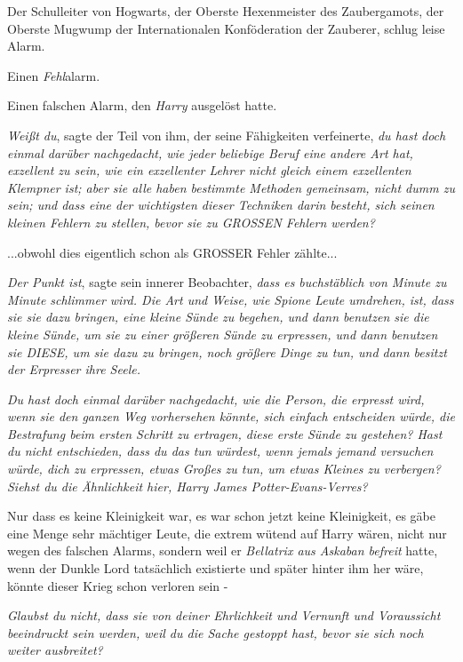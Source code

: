 {Der Schulleiter von Hogwarts, der Oberste Hexenmeister des Zaubergamots, der Oberste Mugwump der Internationalen Konföderation der Zauberer, schlug leise Alarm.

Einen \emph{Fehl}alarm.

Einen falschen Alarm, den \emph{Harry} ausgelöst hatte.

\emph{Weißt du}, sagte der Teil von ihm, der seine Fähigkeiten verfeinerte, \emph{du hast} \emph{doch} \emph{einmal darüber nachgedacht, wie jeder beliebige Beruf eine andere Art hat, exzellent zu sein, wie ein exzellenter Lehrer nicht gleich einem exzellenten Klempner ist; aber sie alle haben bestimmte Methoden gemeinsam, nicht dumm zu sein; und dass eine der wichtigsten dieser Techniken darin besteht, sich seinen kleinen Fehlern zu stellen, bevor sie zu GROSSEN Fehlern werden?}

...obwohl dies eigentlich schon als GROSSER Fehler zählte...

\emph{Der Punkt ist}, sagte sein innerer Beobachter, \emph{dass es buchstäblich von Minute zu Minute schlimmer wird. Die Art und Weise, wie Spione Leute umdrehen, ist, dass sie sie dazu bringen, eine kleine Sünde zu begehen, und dann benutzen sie die kleine Sünde, um sie zu einer größeren Sünde zu erpressen, und dann benutzen sie DIESE, um sie dazu zu bringen, noch größere Dinge zu tun, und dann besitzt der Erpresser ihre Seele.}

\emph{\emph{Du hast doch einmal darüber nachgedacht, wie die Person, die erpresst wird, wenn sie den ganzen Weg vorhersehen könnte, sich einfach entscheiden würde, die Bestrafung beim ersten Schritt zu ertragen, diese erste Sünde zu gestehen? Hast du nicht entschieden, dass du das tun würdest, wenn jemals jemand versuchen würde, dich zu erpressen, etwas Großes zu tun, um etwas Kleines zu verbergen? Siehst du die Ähnlichkeit hier, Harry James Potter-Evans-Verres?}}

Nur dass es keine Kleinigkeit war, es war schon jetzt keine Kleinigkeit, es gäbe eine Menge sehr mächtiger Leute, die extrem wütend auf Harry wären, nicht nur wegen des falschen Alarms, sondern weil er \emph{Bellatrix aus Askaban befreit} hatte, wenn der Dunkle Lord tatsächlich existierte und später hinter ihm her wäre, könnte dieser Krieg schon verloren sein -

\emph{\emph{Glaubst du nicht, dass sie von deiner Ehrlichkeit und Vernunft und Voraussicht beeindruckt sein werden, weil du die Sache gestoppt hast, bevor sie sich noch weiter ausbreitet?}}

}
